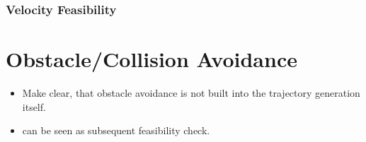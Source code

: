 \subsubsection{Velocity Feasibility}

\section{Obstacle/Collision Avoidance}\label{sec:collision-avoidance}

\begin{itemize}
	\color{red}
	\item Make clear, that obstacle avoidance is not built into the trajectory generation itself. 
	\item can be seen as subsequent feasibility check. 
\end{itemize}

